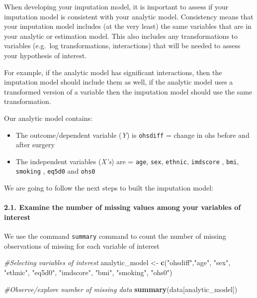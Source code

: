 \documentclass[
]{article}
\newenvironment{Shaded}{\begin{snugshade}}{\end{snugshade}}
\newcommand{\CommentTok}[1]{\textcolor[rgb]{0.56,0.35,0.01}{\textit{#1}}}
\newcommand{\FunctionTok}[1]{\textcolor[rgb]{0.13,0.29,0.53}{\textbf{#1}}}
\newcommand{\NormalTok}[1]{#1}
\newcommand{\OtherTok}[1]{\textcolor[rgb]{0.56,0.35,0.01}{#1}}
\newcommand{\StringTok}[1]{\textcolor[rgb]{0.31,0.60,0.02}{#1}}
\providecommand{\tightlist}{%
  \setlength{\itemsep}{0pt}\setlength{\parskip}{0pt}}
\begin{document}
When developing your imputation model, it is important to assess if your
imputation model is consistent with your analytic model. Consistency
means that your imputation model includes (at the very least) the same
variables that are in your analytic or estimation model. This also
includes any transformations to variables (e.g.~log transformations,
interactions) that will be needed to assess your hypothesis of interest.

For example, if the analytic model has significant interactions, then
the imputation model should include them as well, if the analytic model
uses a transformed version of a variable then the imputation model
should use the same transformation.

Our analytic model contains:

\begin{itemize}
\tightlist
\item
  The outcome/dependent variable (\emph{Y}) is \texttt{ohsdiff} = change
  in ohs before and after surgery
\item
  The independent variables (\emph{X's}) are = \texttt{age},
  \texttt{sex}, \texttt{ethnic}, \texttt{imdscore} , \texttt{bmi},
  \texttt{smoking} , \texttt{eq5d0} and \texttt{ohs0}
\end{itemize}

We are going to follow the next steps to built the imputation model:

\hypertarget{examine-the-number-of-missing-values-among-your-variables-of-interest}{%
\paragraph{2.1. Examine the number of missing values among your
variables of
interest}\label{examine-the-number-of-missing-values-among-your-variables-of-interest}}

We use the command \texttt{summary} command to count the number of
missing observations of missing for each variable of interest

\begin{Shaded}
\begin{Highlighting}[]
\CommentTok{\#Selecting variables of interest}
\NormalTok{analytic\_model }\OtherTok{\textless{}{-}} \FunctionTok{c}\NormalTok{(}\StringTok{"ohsdiff"}\NormalTok{,}\StringTok{"age"}\NormalTok{, }\StringTok{"sex"}\NormalTok{, }\StringTok{"ethnic"}\NormalTok{, }\StringTok{"eq5d0"}\NormalTok{, }\StringTok{"imdscore"}\NormalTok{, }\StringTok{"bmi"}\NormalTok{, }\StringTok{"smoking"}\NormalTok{, }\StringTok{"ohs0"}\NormalTok{)}

\CommentTok{\#Observe/explore number of missing data}
\FunctionTok{summary}\NormalTok{(data[analytic\_model])}
\end{Highlighting}
\end{Shaded}
\end{document}
